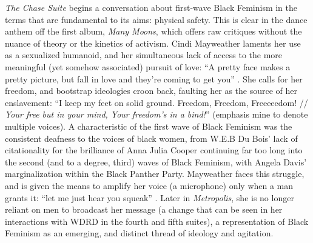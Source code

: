 \documentclass[a4paper, 11pt]{article} %
\begin{document}
\emph{The Chase Suite} begins a conversation about first-wave Black Feminism in the terms that are fundamental to its aims: physical safety.
This is clear in the dance anthem off the first album, \emph{Many Moons}, which offers raw critiques without the nuance of theory or the kinetics of activism.
Cindi Mayweather laments her use as a sexualized humanoid, and her simultaneous lack of access to the more meaningful (yet somehow associated) pursuit of love: ``A pretty face makes a pretty picture, but fall in love and they're coming to get you'' .
She calls for her freedom, and bootstrap ideologies croon back, faulting her as the source of her enslavement: ``I keep my feet on solid ground. Freedom, Freedom, Freeeeedom! // \emph{Your free but in your mind, Your freedom's in a bind!}''  (emphasis mine to denote multiple voices).
A characteristic of the first wave of Black Feminism was the consistent deafness to the voices of black women, from W.E.B Du Bois' lack of citationality for the brilliance of Anna Julia Cooper  continuing far too long into the second (and to a degree, third) waves of Black Feminism, with Angela Davis' marginalization within the Black Panther Party.
Mayweather faces this struggle, and is given the means to amplify her voice (a microphone) only when a man grants it: ``let me just hear you squeak'' .
Later in \emph{Metropolis}, she is no longer reliant on men to broadcast her message (a change that can be seen in her interactions with WDRD in the fourth and fifth suites), a representation of Black Feminism as an emerging, and distinct thread of ideology and agitation. 
\end{document}
